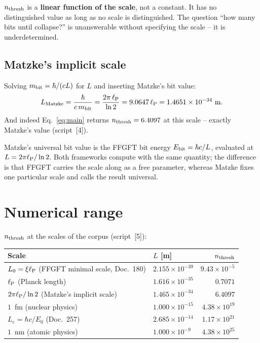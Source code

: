 \begin{tcolorbox}[warnbox, title={What follows}]
  $n_{\mathrm{thresh}}$ is a \textbf{linear function of the scale}, not a constant.
  It has no distinguished value as long as no scale is distinguished.
  The question \enquote{how many bits until collapse?} is unanswerable
  without specifying the scale -- it is underdetermined.
\end{tcolorbox}

\subsection{Matzke's implicit scale}

Solving $m_{\mathrm{bit}} = \hbar/(cL)$ for $L$ and inserting Matzke's bit value:
\begin{equation}
  L_{\mathrm{Matzke}} = \frac{\hbar}{c\,m_{\mathrm{bit}}}
                      = \frac{2\pi\,\ell_{\mathrm{P}}}{\ln 2}
                      = 9.0647\,\ell_{\mathrm{P}}
                      = 1.4651\times10^{-34}~\mathrm{m}.
\end{equation}
And indeed Eq.~\eqref{eq:main} returns $n_{\mathrm{thresh}} = 6.4097$ at this scale --
exactly Matzke's value (script~[4]). \B

\begin{tcolorbox}[ffgftbox, title={Core finding}]
  Matzke's universal bit value is the FFGFT bit energy
  $E_{\mathrm{bit}} = \hbar c/L$, evaluated at $L = 2\pi\ell_{\mathrm{P}}/\ln 2$.
  Both frameworks compute with the same quantity; the difference is that
  FFGFT carries the scale along as a free parameter, whereas Matzke fixes
  one particular scale and calls the result universal.
\end{tcolorbox}

\section{Numerical range}

$n_{\mathrm{thresh}}$ at the scales of the corpus (script~[5]):

\begin{center}
\small
\begin{tabular}{@{}llr@{}}
  \toprule
  \textbf{Scale} & $L$ [m] & $n_{\mathrm{thresh}}$ \\
  \midrule
  $L_0 = \xi\ell_{\mathrm{P}}$ (FFGFT minimal scale, Doc.~180) & $2.155\times10^{-39}$ & $9.43\times10^{-5}$ \\
  $\ell_{\mathrm{P}}$ (Planck length)                           & $1.616\times10^{-35}$ & $0.7071$ \\
  $2\pi\ell_{\mathrm{P}}/\ln 2$ (Matzke's implicit scale)       & $1.465\times10^{-34}$ & $\mathbf{6.4097}$ \\
  $1$~fm (nuclear physics)                        & $1.000\times10^{-15}$ & $4.38\times10^{19}$ \\
  $L_e = \hbar c/E_0$ (Doc.~257)                  & $2.685\times10^{-14}$ & $1.17\times10^{21}$ \\
  $1$~nm (atomic physics)                         & $1.000\times10^{-9}$  & $4.38\times10^{25}$ \\
  \bottomrule
\end{tabular}
\end{center}

